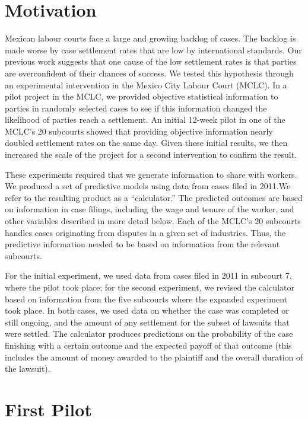 \documentclass[]{article}
\title{}
\author{}
\date{}
\begin{document}
\section{Motivation}\label{motivation}

Mexican labour courts face a large and growing backlog of cases. The
backlog is made worse by case settlement rates that are low by
international standards. Our previous work suggests that one cause of
the low settlement rates is that parties are overconfident of their
chances of success. We tested this hypothesis through an experimental
intervention in the Mexico City Labour Court (MCLC). In a pilot project
in the MCLC, we provided objective statistical information to parties in
randomly selected cases to see if this information changed the
likelihood of parties reach a settlement. An initial 12-week pilot in
one of the MCLC's 20 subcourts showed that providing objective
information nearly doubled settlement rates on the same day. Given these
initial results, we then increased the scale of the project for a second
intervention to confirm the result.

These experiments required that we generate information to share with
workers. We produced a set of predictive models using data from cases
filed in 2011.We refer to the resulting product as a ``calculator.'' The
predicted outcomes are based on information in case filings, including
the wage and tenure of the worker, and other variables described in more
detail below. Each of the MCLC's 20 subcourts handles cases originating
from disputes in a given set of industries. Thus, the predictive
information needed to be based on information from the relevant
subcourts.

For the initial experiment, we used data from cases filed in 2011 in
subcourt 7, where the pilot took place; for the second experiment, we
revised the calculator based on information from the five subcourts
where the expanded experiment took place. In both cases, we used data on
whether the case was completed or still ongoing, and the amount of any
settlement for the subset of lawsuits that were settled. The calculator
produces predictions on the probability of the case finishing with a
certain outcome and the expected payoff of that outcome (this includes
the amount of money awarded to the plaintiff and the overall duration of
the lawsuit).

\section{First Pilot}\label{first-pilot}
\end{document}
